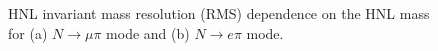 \documentclass[../main.tex]{subfiles}
\begin{document}
\begin{figure}[h!]
    \begin{minipage}[h]{0.49\linewidth}
    \end{minipage}
    \hfill
    \begin{minipage}[h]{0.49\linewidth}
    \end{minipage}
    \caption{HNL invariant mass resolution (RMS) dependence on the HNL mass for (a) $N\to \mu\pi$ mode and (b) $N\to e\pi$ mode.}
    \label{fig:HNL:InvMassPlot}
\end{figure}
\end{document}
